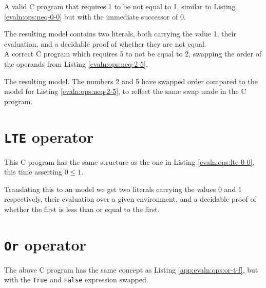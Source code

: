     
    A valid C program that requires 1 to be not equal to 1, similar to Listing \ref{evaln:ops:neq-0-0} but with the immediate successor of 0.
    
    The resulting model contains two literals, both carrying the value 1, their evaluation, and a decidable proof of whether they are not equal.
    \\
    
    
    A correct C program which requires 5 to not be equal to 2, swapping the order of the operands from Listing \ref{evaln:ops:neq-2-5}.
    
    The resulting \Idris model. The numbers 2 and 5 have swapped order compared to the model for Listing \ref{evaln:ops:neq-2-5}, to reflect the same swap made in the C program.


\section{\texttt{LTE} operator}\label{app:evaln:ops:lte}
    
    
    This C program has the same structure as the one in Listing \ref{evaln:ops:lte-0-0}, this time asserting $0 \leq 1$.
    
    
    Translating this to an \Idris model we get two literals carrying the values 0 and 1 respectively, their evaluation over a given environment, and a decidable proof of whether the first is less than or equal to the first.

    
    


\section{\texttt{Or} operator}\label{app:evaln:ops:or}
    
    
    The above C program has the same concept as Listing \ref{app:evaln:ops:or-t-f}, but with the \texttt{True} and \texttt{False} expression swapped.
